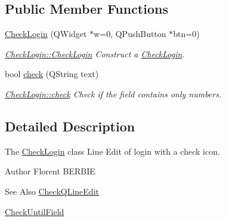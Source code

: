 \subsection*{Public Member Functions}
\begin{DoxyCompactItemize}
\item 
\hyperlink{classGui_1_1Widgets_1_1CheckFields_1_1CheckLogin_ae6c94e817b4b079329d6c4c129fd2a4c}{Check\-Login} (Q\-Widget $\ast$w=0, Q\-Push\-Button $\ast$btn=0)
\begin{DoxyCompactList}\small\item\em \hyperlink{classGui_1_1Widgets_1_1CheckFields_1_1CheckLogin_ae6c94e817b4b079329d6c4c129fd2a4c}{Check\-Login\-::\-Check\-Login} Construct a \hyperlink{classGui_1_1Widgets_1_1CheckFields_1_1CheckLogin}{Check\-Login}. \end{DoxyCompactList}\item 
bool \hyperlink{classGui_1_1Widgets_1_1CheckFields_1_1CheckLogin_a66e6d426253b5219a55b7ccada37d9b9}{check} (Q\-String text)
\begin{DoxyCompactList}\small\item\em \hyperlink{classGui_1_1Widgets_1_1CheckFields_1_1CheckLogin_a66e6d426253b5219a55b7ccada37d9b9}{Check\-Login\-::check} Check if the field contains only numbers. \end{DoxyCompactList}\end{DoxyCompactItemize}


\subsection{Detailed Description}
The \hyperlink{classGui_1_1Widgets_1_1CheckFields_1_1CheckLogin}{Check\-Login} class Line Edit of login with a check icon. 

\begin{DoxyAuthor}{Author}
Florent B\-E\-R\-B\-I\-E 
\end{DoxyAuthor}
\begin{DoxySeeAlso}{See Also}
\hyperlink{classGui_1_1Widgets_1_1CheckFields_1_1CheckQLineEdit}{Check\-Q\-Line\-Edit} 

\hyperlink{classGui_1_1Widgets_1_1CheckFields_1_1CheckUntilField}{Check\-Until\-Field} 
\end{DoxySeeAlso}


